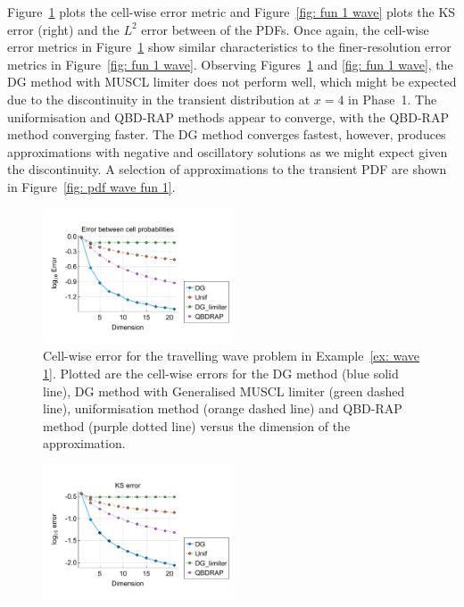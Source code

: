 \begin{example}
	Figure~\ref{fig: fun 1 wave cp} plots the cell-wise error metric and Figure~\ref{fig: fun 1 wave} plots the KS error (right) and the \(L^2\) error between of the PDFs. Once again, the cell-wise error metrics in Figure~\ref{fig: fun 1 wave cp} show similar characteristics to the finer-resolution error metrics in Figure~\ref{fig: fun 1 wave}. Observing Figures~\ref{fig: fun 1 wave cp} and \ref{fig: fun 1 wave}, the DG method with MUSCL limiter does not perform well, which might be expected due to the discontinuity in the transient distribution at \(x=4\) in Phase~1. The uniformisation and QBD-RAP methods appear to converge, with the QBD-RAP method converging faster. The DG method converges fastest, however, produces approximations with negative and oscillatory solutions as we might expect given the discontinuity. A selection of approximations to the transient PDF are shown in Figure~\ref{fig: pdf wave fun 1}.
	\begin{figure}[h]
		\centering
		\includegraphics[width=0.5\textwidth,trim={0.75cm 0.8cm 0.25cm 1.25cm},clip]{chapter6/figs/wave/fun1/L1_cell_probs.pdf} 
		\caption{Cell-wise error for the travelling wave problem in Example~\ref{ex: wave 1}. Plotted are the cell-wise errors for the DG method (blue solid line), DG method with Generalised MUSCL limiter (green dashed line), uniformisation method (orange dashed line) and QBD-RAP method (purple dotted line) versus the dimension of the approximation.}  
		\label{fig: fun 1 wave cp} 
	\end{figure}
	\begin{figure}[h]
		\centering
		\includegraphics[width=0.5\textwidth,trim={0.75cm 0.8cm 0.25cm 1.25cm},clip]{chapter6/figs/wave/fun1/meshs_ks_error_formatted.pdf}%

\end{figure}
\end{example}
